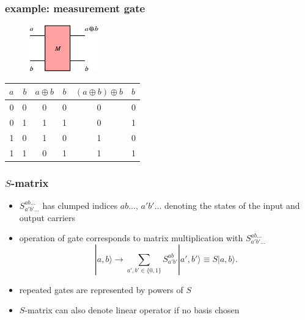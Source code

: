 \documentclass{beamer}
\begin{document}
\begin{frame}
    \frametitle{example: measurement gate}
    \begin{figure}
		\centering
        \includegraphics[width=3cm]{mGate.png}
    \end{figure}
    \begin{table}
        \begin{tabular}{rr|cc|cl}
            $a$&$b$&$a\oplus b$&$b$&$(a\oplus b)\oplus b$&$b$\\
            \hline\hline
            0&0&0&0&0&0\\
            0&1&1&1&0&1\\
            1&0&1&0&1&0\\
            1&1&0&1&1&1
        \end{tabular}
    \end{table}
\end{frame}
%
\begin{frame}
	\frametitle{$S$-matrix}
	\begin{itemize}
		\item $S_{a'b'\ldots}^{ab\ldots}$ has clumped indices $ab\ldots$, $a'b'\ldots$ denoting the states of the input and output carriers
		\item operation of gate corresponds to matrix multiplication with $S_{a'b'\ldots}^{ab\ldots}$
		\begin{equation}
            |a,b\rangle\to\sum_{a',b'\in\{0,1\}} S_{a'b'}^{ab}|a',b'\rangle\equiv S|a,b\rangle.
		\end{equation}
		\item repeated gates are represented by powers of $S$
		\item $S$-matrix can also denote linear operator if no basis chosen
	\end{itemize}
\end{frame}
%
\end{document}
